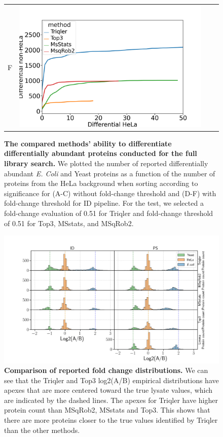 \documentclass[11pt]{article}
\begin{document}
\begin{figure}[hbt]
\begin{tabular}{lclc}
        F & \includegraphics[width=0.4\linewidth]{../../result/plot_full_complete_full_lib_run_20221215/diff_HeLa_vs_nonHeLa_ID_all_0.51.png} \\ 

    \end{tabular}
    \caption{{\bf The compared methods' ability to differentiate differentially abundant proteins conducted for the full library search.} We plotted the number of reported differentially abundant  {\em E. Coli} and Yeast proteins as a function of the number of proteins from the HeLa background when sorting according to significance for (A-C) without fold-change threshold and (D-F) with fold-change threshold for ID pipeline. For the test, we selected a fold-change evaluation of 0.51 for Triqler and fold-change threshold of 0.51 for Top3, MSstats, and MSqRob2. \label{fig:ability_to_differentiate_differentially_abundant_specie_vs_hela}}
\end{figure}


\begin{figure}[hbt]
    \centering
    \setlength{\tabcolsep}{0pt}

    \includegraphics[width=\linewidth]{../../result/report_plots/gridplot_histogram.png} 


    \caption{{\bf Comparison of reported fold change distributions.} We can see that the Triqler and Top3 log2(A/B) empirical distributions have apexes that are more centered toward the true lysate values, which are indicated by the dashed lines. The apexes for Triqler have higher protein count than MSqRob2, MSstats and Top3. This shows that there are more proteins closer to the true values identified by Triqler than the other methods. \label{fig:fc_histogram_supplement}}
    
\end{figure}
\end{document}
